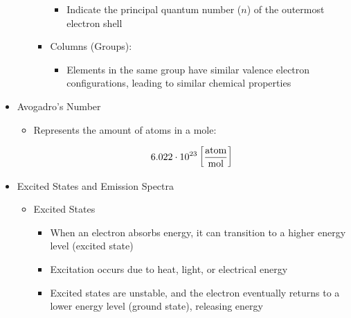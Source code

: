 \begin{itemize}
\begin{itemize}
\begin{itemize}
\begin{itemize}
              \item Indicate the principal quantum number ($n$) of the outermost electron shell

            \end{itemize}

          \item Columns (Groups):

            \begin{itemize}

              \item Elements in the same group have similar valence electron configurations, leading to similar chemical properties

            \end{itemize}

        \end{itemize}

    \end{itemize}

  \item Avogadro's Number

    \begin{itemize}

      \item Represents the amount of atoms in a mole:

        $$6.022\cdot10^{23}\left[\si{atom\over mol}\right]$$

    \end{itemize}

  \item Excited States and Emission Spectra

    \begin{itemize}

      \item Excited States

        \begin{itemize}

          \item When an electron absorbs energy, it can transition to a higher energy level (excited state)

          \item Excitation occurs due to heat, light, or electrical energy

          \item Excited states are unstable, and the electron eventually returns to a lower energy level (ground state), releasing energy

        \end{itemize}


\end{itemize}
\end{itemize}

